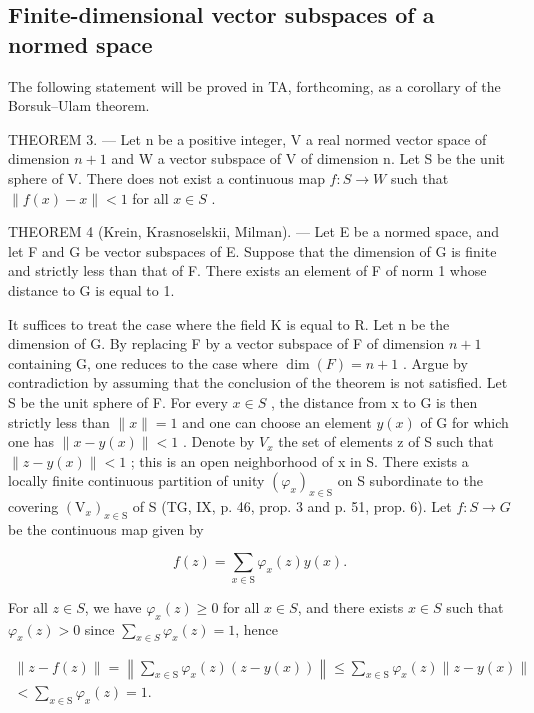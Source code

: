 \subsection{Finite-dimensional vector subspaces of a normed space}

The following statement will be proved in TA, forthcoming, as a corollary of the Borsuk–Ulam theorem.

THEOREM 3. — Let n be a positive integer, V a real normed vector space of dimension \(n + 1\) and W a vector subspace of V of dimension n. Let S be the unit sphere of V. There does not exist a continuous map \(f: S \to W\) such that \(\|f(x) - x\| < 1\) for all \(x \in S\) .

THEOREM 4 (Krein, Krasnoselskii, Milman). — Let E be a normed space, and let F and G be vector subspaces of E. Suppose that the dimension of G is finite and strictly less than that of F. There exists an element of F of norm 1 whose distance to G is equal to 1.

It suffices to treat the case where the field K is equal to R. Let n be the dimension of G. By replacing F by a vector subspace of F of dimension \(n+1\) containing G, one reduces to the case where \(\dim(F)=n+1\) . Argue by contradiction by assuming that the conclusion of the theorem is not satisfied. Let S be the unit sphere of F. For every \(x\in S\) , the distance from x to G is then strictly less than \(\|x\|=1\) and one can choose an element \(y(x)\) of G for which one has \(\|x-y(x)\|<1\) . Denote by \(V_{x}\) the set of elements z of S such that \(\|z-y(x)\|<1\) ; this is an open neighborhood of x in S. There exists a locally finite continuous partition of unity \((\varphi_{x})_{x\in\mathrm{S}}\) on S subordinate to the covering \((\mathrm{V}_{x})_{x\in\mathrm{S}}\) of S (TG, IX, p. 46, prop. 3 and p. 51, prop. 6). Let \(f\colon S\to G\) be the continuous map given by

\[
f (z) = \sum_ {x \in \mathrm{S}} \varphi_ {x} (z) y (x).
\]

For all \(z \in S\), we have \(\varphi_x(z) \geqslant 0\) for all \(x \in S\), and there exists \(x \in S\) such that \(\varphi_x(z) > 0\) since \(\sum_{x \in S} \varphi_x(z) = 1\), hence

\[
\begin{array}{c} \| z - f (z) \| = \left\| \sum_ {x \in \mathrm{S}} \varphi_ {x} (z) (z - y (x)) \right\| \leqslant \sum_ {x \in \mathrm{S}} \varphi_ {x} (z) \| z - y (x) \| \\ <   \sum_ {x \in \mathrm{S}} \varphi_ {x} (z) = 1. \end{array}
\]

